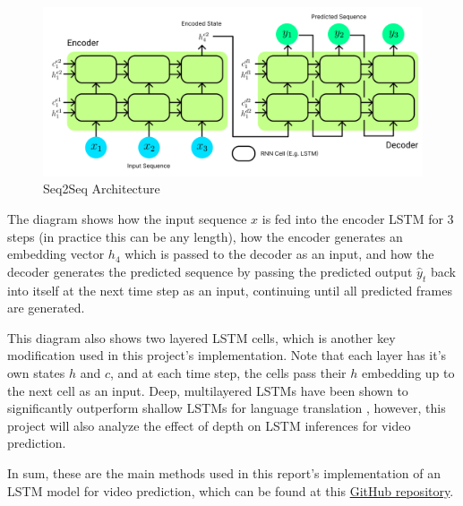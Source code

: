 \documentclass{scrartcl}
\begin{document}
\begin{figure}[H]
	\begin{center}
		\includegraphics[width=1\textwidth]{figures/seq2seq_arch.png}
	\end{center}
	\caption{Seq2Seq Architecture}
	\label{fig:seq2seq_arch}
\end{figure}

The diagram shows how the input sequence $x$ is fed into the encoder LSTM for 3
steps (in practice this can be any length), how the encoder generates an
embedding vector $h_4$ which is passed to the decoder as an input, and how the
decoder generates the predicted sequence by passing the predicted output
$\hat{y}_{t}$ back into itself at the next time step as an input, continuing until
all predicted frames are generated.

This diagram also shows two layered LSTM cells, which is another key
modification used in this project's implementation. Note that each layer has
it's own states $h$ and $c$, and at each time step, the cells pass their $h$
embedding up to the next cell as an input. Deep, multilayered LSTMs have been
shown to significantly outperform shallow LSTMs for language translation
\cite{seq2seq_original}, however, this project will also analyze the effect of
depth on LSTM inferences for video prediction. 

In sum, these are the main methods used in this report's implementation of an
LSTM model for video prediction, which can be found at this
\href{https://github.com/msc5/junior-iw}{GitHub repository}.
\end{document}
